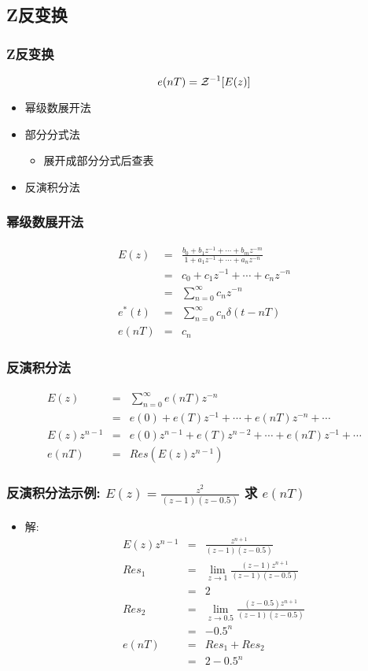 \documentclass[table]{article}
\begin{document}
\subsection{Z反变换}
\label{sec-3-2}
\begin{frame}
\frametitle{Z反变换}
\label{sec-3-2-1}

  \[e(nT)={\cal Z}^{-1}[E(z)]\]
\begin{itemize}
\item 幂级数展开法
\item 部分分式法
\begin{itemize}
\item 展开成部分分式后查表
\end{itemize}
\item 反演积分法
\end{itemize}
\end{frame}
\begin{frame}
\frametitle{幂级数展开法}
\label{sec-3-2-2}

\begin{eqnarray*}
E(z) & = &\frac{b_0+b_1 z^{-1}+\cdots+b_m z^{-m}}{1+a_1 z^{-1}+\cdots+a_n z^{-n}} \\
 &=& c_0+c_1 z^{-1}+\cdots +c_n z^{-n} \\
 &=& \sum_{n=0}^{\infty}c_n z^{-n} \\
e^{*}(t) &=& \sum_{n=0}^{\infty}c_n\delta(t-nT) \\
e(nT) &=& c_n 
\end{eqnarray*}
\end{frame}
\begin{frame}
\frametitle{反演积分法}
\label{sec-3-2-3}

\begin{eqnarray*}
E(z) & = & \sum_{n=0}^{\infty}e(nT)z^{-n} \\
  &=& e(0)+e(T)z^{-1}+\cdots+e(nT)z^{-n}+\cdots \\
E(z)z^{n-1} &=& e(0)z^{n-1}+e(T)z^{n-2}+\cdots+e(nT)z^{-1}+\cdots \\
e(nT)&=& Res(E(z)z^{n-1})
\end{eqnarray*}
\end{frame}
\begin{frame}
\frametitle{反演积分法示例:  $E(z)=\frac{z^2}{(z-1)(z-0.5)}$  求  $e(nT)$}
\label{sec-3-2-4}

\begin{itemize}
\item <2->解:
      \begin{eqnarray*}
      E(z)z^{n-1} & = &\frac{z^{n+1}}{(z-1)(z-0.5)} \\
      Res_1 &=& \lim_{z\rightarrow 1}\frac{(z-1)z^{n+1}}{(z-1)(z-0.5)} \\
	 &=& 2 \\
      Res_2 &=& \lim_{z\rightarrow 0.5}\frac{(z-0.5)z^{n+1}}{(z-1)(z-0.5)} \\
	 &=& -0.5^n \\
      e(nT) &=& Res_1+Res_2 \\
       &=& 2-0.5^n
      \end{eqnarray*}
\end{itemize}
\end{frame}
\end{document}
